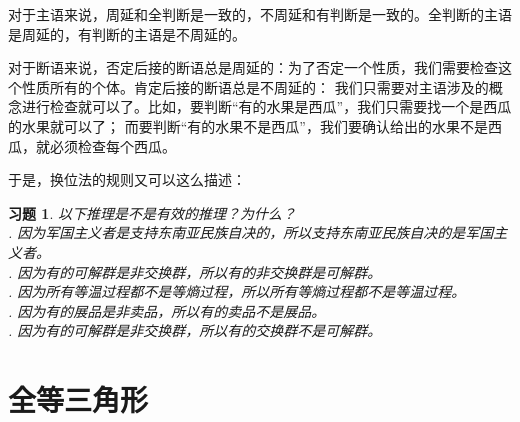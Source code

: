 \documentclass[12pt,UTF8]{ctexbook}
\newtheorem{sk}{思考}[section]
\newtheorem{xt}{习题}[section]
\begin{document}
对于主语来说，周延和全判断是一致的，不周延和有判断是一致的。全判断的主语是周延的，有判断的主语是不周延的。

对于断语来说，否定后接的断语总是周延的：为了否定一个性质，我们需要检查这个性质所有的个体。肯定后接的断语总是不周延的：
我们只需要对主语涉及的概念进行检查就可以了。比如，要判断“有的水果是西瓜”，我们只需要找一个是西瓜的水果就可以了；
而要判断“有的水果不是西瓜”，我们要确认给出的水果不是西瓜，就必须检查每个西瓜。

于是，换位法的规则又可以这么描述：
\begin{center}
\end{center}

\begin{xt}\label{xt:2-0-1}
    以下推理是不是有效的推理？为什么？\\
    . 因为军国主义者是支持东南亚民族自决的，所以支持东南亚民族自决的是军国主义者。 \\
    . 因为有的可解群是非交换群，所以有的非交换群是可解群。 \\
    . 因为所有等温过程都不是等熵过程，所以所有等熵过程都不是等温过程。 \\
    . 因为有的展品是非卖品，所以有的卖品不是展品。 \\
    . 因为有的可解群是非交换群，所以有的交换群不是可解群。
\end{xt}



\chapter{全等三角形}
\end{document}
